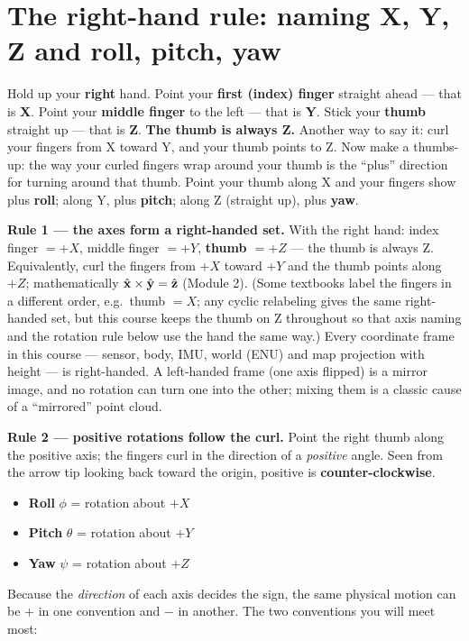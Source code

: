\section{The right-hand rule: naming X, Y, Z and roll, pitch, yaw}
\begin{kid}
Hold up your \textbf{right} hand. Point your \textbf{first (index) finger} straight ahead --- that is \textbf{X}. Point your \textbf{middle finger} to the left --- that is \textbf{Y}. Stick your \textbf{thumb} straight up --- that is \textbf{Z}. \textbf{The thumb is always Z.} Another way to say it: curl your fingers from X toward Y, and your thumb points to Z. Now make a thumbs-up: the way your curled fingers wrap around your thumb is the ``plus'' direction for turning around that thumb. Point your thumb along X and your fingers show plus \textbf{roll}; along Y, plus \textbf{pitch}; along Z (straight up), plus \textbf{yaw}.
\end{kid}


\begin{eng}
\textbf{Rule 1 --- the axes form a right-handed set.} With the right hand: index finger $=+X$, middle finger $=+Y$, \textbf{thumb $=+Z$} --- the thumb is always Z. Equivalently, curl the fingers from $+X$ toward $+Y$ and the thumb points along $+Z$; mathematically $\hat{\mathbf{x}}\times\hat{\mathbf{y}}=\hat{\mathbf{z}}$ (Module 2). (Some textbooks label the fingers in a different order, e.g.\ thumb $=X$; any cyclic relabeling gives the same right-handed set, but this course keeps the thumb on Z throughout so that axis naming and the rotation rule below use the hand the same way.) Every coordinate frame in this course --- sensor, body, IMU, world (ENU) and map projection with height --- is right-handed. A left-handed frame (one axis flipped) is a mirror image, and no rotation can turn one into the other; mixing them is a classic cause of a ``mirrored'' point cloud.

\textbf{Rule 2 --- positive rotations follow the curl.} Point the right thumb along the positive axis; the fingers curl in the direction of a \emph{positive} angle. Seen from the arrow tip looking back toward the origin, positive is \textbf{counter-clockwise}.
\begin{itemize}
\item \textbf{Roll} $\phi$ = rotation about $+X$
\item \textbf{Pitch} $\theta$ = rotation about $+Y$
\item \textbf{Yaw} $\psi$ = rotation about $+Z$
\end{itemize}
Because the \emph{direction} of each axis decides the sign, the same physical motion can be $+$ in one convention and $-$ in another. The two conventions you will meet most:
\end{eng}

